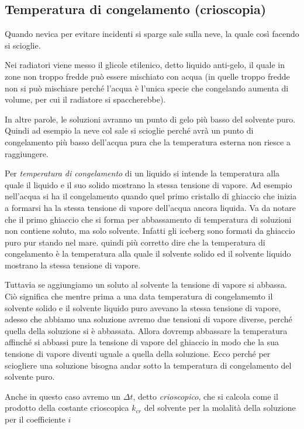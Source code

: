 \subsection{Temperatura di congelamento (crioscopia)}
Quando nevica per evitare incidenti si sparge sale sulla neve, la quale così facendo si scioglie.

Nei radiatori viene messo il glicole etilenico, detto liquido anti-gelo, il quale in zone non troppo fredde può essere mischiato con acqua (in quelle troppo fredde non si può mischiare perché l'acqua è l'unica specie che congelando aumenta di volume, per cui il radiatore si spaccherebbe).

In altre parole, le soluzioni avranno un punto di gelo più basso del solvente puro. Quindi ad esempio la neve col sale si scioglie perché avrà un punto di congelamento più basso dell'acqua pura che la temperatura esterna non riesce a raggiungere.

Per \textit{temperatura di congelamento} di un liquido si intende la temperatura alla quale il liquido e il suo solido mostrano la stessa tensione di vapore. Ad esempio nell'acqua si ha il congelamento quando quel primo cristallo di ghiaccio che inizia a formarsi ha la stessa tensione di vapore dell'acqua ancora liquida. Va da notare che il primo ghiaccio che si forma per abbassamento di temperatura di soluzioni non contiene soluto, ma solo solvente. Infatti gli iceberg sono formati da ghiaccio puro pur stando nel mare. \E quindi più corretto dire che la temperatura di congelamento è la temperatura alla quale il solvente solido ed il solvente liquido mostrano la stessa tensione di vapore.

Tuttavia se aggiungiamo un soluto al solvente la tensione di vapore si abbassa. Ciò significa che mentre prima a una data temperatura di congelamemto il solvente solido e il solvente liquido puro avevano la stessa tensione di vapore, adesso che abbiamo una soluzione avremo due tensioni di vapore diverse, perché quella della soluzione si è abbassata. Allora dovremp abbassare la temperatura affinché si abbassi pure la tensione di vapore del ghiaccio in modo che la sua tensione di vapore diventi uguale a quella della soluzione. Ecco perché per sciogliere una soluzione bisogna andar sotto la temperatura di congelamento del solvente puro.

Anche in questo caso avremo un $\Delta t$, detto \textit{crioscopico}, che si calcola come il prodotto della costante crioscopica $k_{cr}$ del solvente per la molalità della soluzione per il coefficiente $i$

